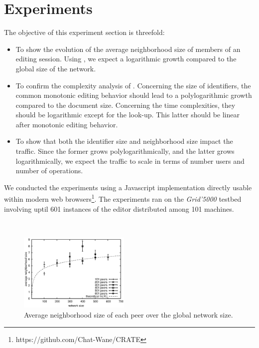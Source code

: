 \section{Experiments}
\label{sec:experiments}

The objective of this experiment section is threefold:
\begin{itemize}
\item To show the evolution of the average neighborhood size of members of an
  editing session. Using \SPRAY, we expect a logarithmic growth compared to the
  global size of the network.
\item To confirm the complexity analysis of \LSEQ. Concerning the size of
  identifiers, the common monotonic editing behavior should lead to a
  polylogarithmic growth compared to the document size. Concerning the time
  complexities, they should be logarithmic except for the look-up. This latter
  should be linear after monotonic editing behavior.
\item To show that both the identifier size and neighborhood size impact the
  traffic. Since the former grows polylogarithmically, and the latter grows
  logarithmically, we expect the traffic to scale in terms of number users and
  number of operations.
\end{itemize}

We conducted the experiments using a Javascript implementation directly usable
within modern web browsers\footnote{https://github.com/Chat-Wane/CRATE}. The
experiments ran on the \emph{Grid'5000} testbed involving uptil 601 instances of
the editor distributed among 101 machines.

\ \\ 

\begin{figure}
  \centering
  \includegraphics[width=0.475\textwidth]{./img/partialview.eps}
  \caption{\label{fig:partialview} Average neighborhood size of each peer over
  the global network size.}
\end{figure}

